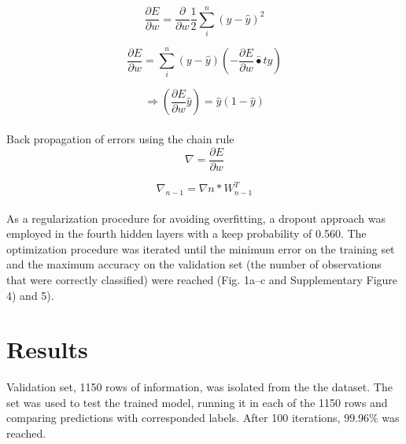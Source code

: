 \documentclass{llncs}       %
\begin{document}
\begin{equation} 
\frac{\partial E}{\partial w}=\frac{\partial }{\partial w} \frac{1}{2}\sum_i^n( y -\widehat{y})^2
\end{equation}

\begin{equation} 
\frac{\partial E}{\partial w} = \sum_i^n ( y -\widehat{y})  (-\frac{\partial E}{\partial w}\widehat{•}t{y})
\end{equation}

\begin{equation} 
\Rightarrow(\frac{\partial E}{\partial w}\widehat{y})= \widehat{y}(1-\widehat{y})
\end{equation}

\paragraph{}Back propagation of errors using the chain rule
\begin{equation} 
\nabla=\frac{\partial E}{\partial w}
\end{equation}

\begin{equation} 
\nabla_{n-1}=\nabla{n}*W^{T}_{n-1}
\end{equation}

\paragraph{}
As a regularization procedure for avoiding overfitting, a dropout approach was employed in the fourth hidden layers with a keep probability of 0.560. The optimization procedure was iterated until the minimum error on the training set and the maximum accuracy on the validation set (the number of observations that were correctly classified) were reached (Fig. 1a–c and Supplementary Figure 4) and 5).
\paragraph{}

\paragraph{}\paragraph{}
\section{Results}
\label{sec:4}
Validation set, 1150 rows of information, was isolated from the the dataset.   The set was used to test the trained model, running it in each of the 1150 rows and comparing predictions with corresponded labels.  After 100 iterations, 99.96\% was reached.
\end{document}

